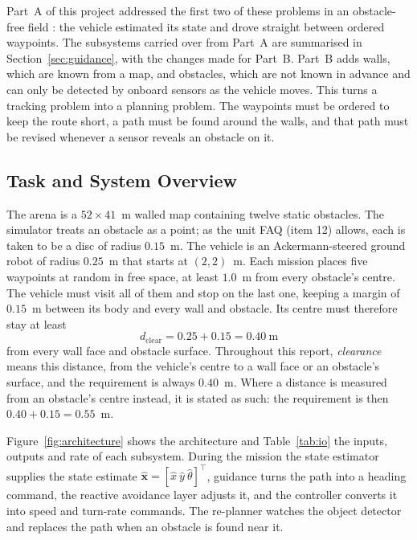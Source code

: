 Part~A of this project addressed the first two of these problems in an
obstacle-free field \cite{partA_est, partA_group}: the vehicle estimated
its state and drove straight between ordered waypoints. The subsystems
carried over from Part~A are summarised in Section~\ref{sec:guidance},
with the changes made for Part~B. Part~B adds
walls, which are known from a map, and obstacles, which are not known in
advance and can only be detected by onboard sensors as the vehicle
moves. This turns a tracking problem into a planning problem. The
waypoints must be ordered to keep the route short, a path must be found
around the walls, and that path must be revised whenever a sensor
reveals an obstacle on it.

\subsection{Task and System Overview}
\label{sec:overview}

The arena is a $52 \times 41$~m walled map containing twelve static
obstacles. The simulator treats an obstacle as a point; as the unit FAQ
(item 12) allows, each is taken to be a disc of radius $0.15$~m. The vehicle is an Ackermann-steered ground
robot of radius $0.25$~m that starts at $(2, 2)$~m. Each mission places
five waypoints at random in free space, at least $1.0$~m from every
obstacle's centre. The vehicle must visit all of them and stop on the last one,
keeping a margin of $0.15$~m between its body and every wall and
obstacle. Its centre must therefore stay at least
\begin{equation}
    d_{\text{clear}} = 0.25 + 0.15 = 0.40\ \text{m}
    \label{eq:clearance}
\end{equation}
from every wall face and obstacle surface. Throughout this report,
\emph{clearance} means this distance, from the vehicle's centre to a
wall face or an obstacle's surface, and the requirement is always
$0.40$~m. Where a distance is measured from an obstacle's centre
instead, it is stated as such: the requirement is then
$0.40 + 0.15 = 0.55$~m.

Figure~\ref{fig:architecture} shows the architecture and
Table~\ref{tab:io} the inputs, outputs and rate of each subsystem. During the mission
the state estimator supplies the state estimate
$\hat{\mathbf{x}} = [\hat{x}\ \hat{y}\ \hat{\theta}]^{\top}$, guidance
turns the path into a heading command, the reactive avoidance layer
adjusts it, and the controller converts it into speed and turn-rate
commands. The re-planner watches the object detector and replaces the
path when an obstacle is found near it.

